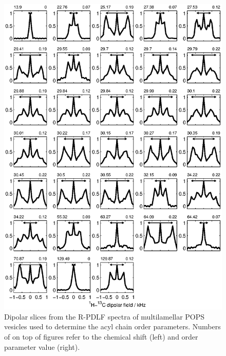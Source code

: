 \documentclass[journal=jctcce,manuscript=article]{achemso}
\begin{document}
\begin{figure}[hbp!] 
  \centering 
  \includegraphics[width=\textwidth]{../Fig/slices_used.eps}
  \caption{\label{R-PDLFslices}
    Dipolar slices from the R-PDLF spectra of multilamellar POPS vesicles used to determine the acyl chain order parameters.
    Numbers of on top of figures refer to the chemical shift (left) and order parameter value (right).
  }
\end{figure} 


%
%
\end{document}
